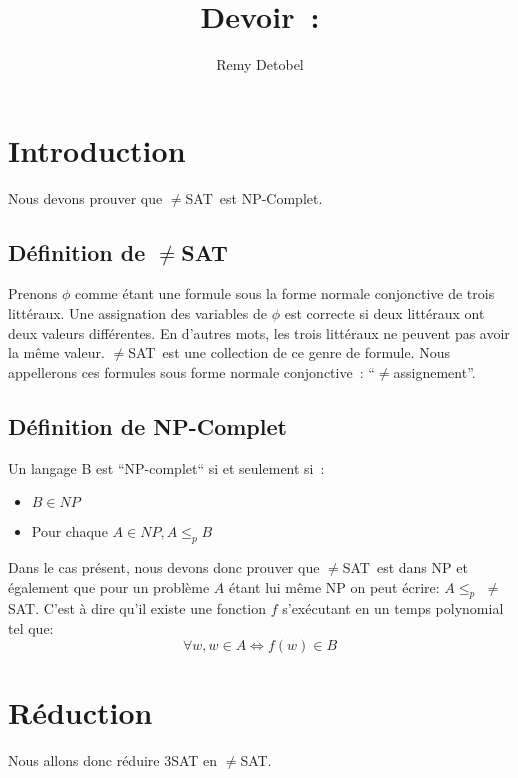 \documentclass[a4paper,11pt]{article}
\title{\vspace{-2.0cm}Devoir~: \neqsat}
\author{Remy Detobel}
\newcommand{\neqsat}{$\neq$SAT}
\newcommand{\neqassign}{$\neq$assignement}
\begin{document}
\maketitle

\section{Introduction}
  Nous devons prouver que \neqsat\ est NP-Complet.
  
  \subsection{Définition de \neqsat}
    Prenons $\phi$ comme étant une formule sous la forme normale conjonctive de trois littéraux.  Une assignation des variables de $\phi$ est correcte si deux littéraux ont deux valeurs différentes.  En d'autres mots, les trois littéraux ne peuvent pas avoir la même valeur.  \neqsat\ est une collection de ce genre de formule.  Nous appellerons ces formules sous forme normale conjonctive~: ``\neqassign''.
  
  \subsection{Définition de NP-Complet}
    Un langage B est ``NP-complet`` si et seulement si~:
    \begin{itemize}
      \item $B \in NP$
      \item Pour chaque $A \in NP, A \leq_{p} B$
    \end{itemize}
    Dans le cas présent, nous devons donc prouver que \neqsat\ est dans NP et également que pour un problème $A$ étant lui même NP on peut écrire: $A \leq_p$ \neqsat.  C'est à dire qu'il existe une fonction $f$ s'exécutant en un temps polynomial tel que:
    $$\forall w, w \in A \Leftrightarrow f(w) \in B$$
    
\section{Réduction}
  Nous allons donc réduire 3SAT en \neqsat.
  
\end{document}
